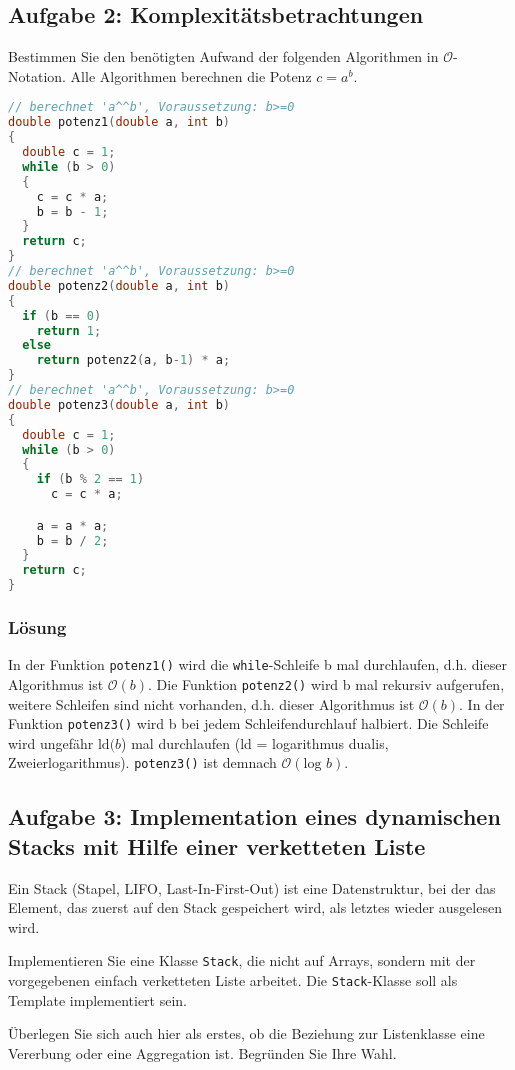 \subsection{Aufgabe 2: Komplexitätsbetrachtungen}
Bestimmen Sie den benötigten Aufwand der folgenden Algorithmen in $\mathcal{O}$-Notation. Alle Algorithmen berechnen die Potenz $c=a^b$.
\begin{lstlisting}[language=C++, style=C++, multicols=2]
// berechnet 'a^^b', Voraussetzung: b>=0
double potenz1(double a, int b)
{
  double c = 1;
  while (b > 0)
  {
    c = c * a;
    b = b - 1;
  }
  return c;
}
// berechnet 'a^^b', Voraussetzung: b>=0
double potenz2(double a, int b)
{
  if (b == 0)
    return 1;
  else
    return potenz2(a, b-1) * a;
}
// berechnet 'a^^b', Voraussetzung: b>=0
double potenz3(double a, int b)
{
  double c = 1;
  while (b > 0)
  {
    if (b % 2 == 1)
      c = c * a;

    a = a * a;
    b = b / 2;
  }
  return c;
}
\end{lstlisting}
\subsubsection{Lösung}
In der Funktion \texttt{potenz1()} wird die \texttt{while}-Schleife b mal durchlaufen, d.h. dieser Algorithmus ist $\mathcal{O}(b)$.
Die Funktion \texttt{potenz2()} wird b mal rekursiv aufgerufen, weitere Schleifen sind nicht vorhanden, d.h. dieser Algorithmus ist $\mathcal{O}(b)$.
In der Funktion \texttt{potenz3()} wird b bei jedem Schleifendurchlauf halbiert. Die Schleife wird ungefähr $\text{ld}(b$) mal durchlaufen (ld = logarithmus dualis, Zweierlogarithmus). \texttt{potenz3()} ist demnach $\mathcal{O}(\text{log } b)$.

\subsection{Aufgabe 3: Implementation eines dynamischen Stacks mit Hilfe einer verketteten Liste}
Ein Stack (Stapel, LIFO, Last-In-First-Out) ist eine Datenstruktur, bei der das Element, das zuerst auf den Stack gespeichert wird, als letztes wieder ausgelesen wird.

Implementieren Sie eine Klasse \texttt{Stack}, die nicht auf Arrays, sondern mit der vorgegebenen einfach verketteten Liste arbeitet. Die \texttt{Stack}-Klasse soll als Template implementiert sein.

Überlegen Sie sich auch hier als erstes, ob die Beziehung zur Listenklasse eine Vererbung oder eine Aggregation ist. Begründen Sie Ihre Wahl.

